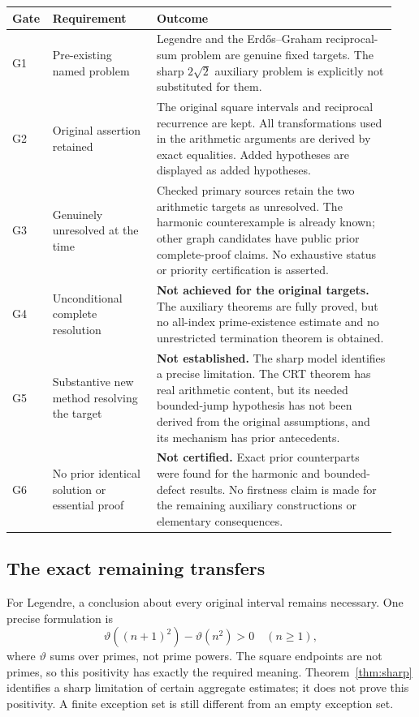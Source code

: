 \documentclass[11pt,a4paper]{article}
\theoremstyle{definition}
\theoremstyle{remark}\newtheorem{remark}[theorem]{Remark}
\begin{document}
\begin{longtable}{@{}p{0.08\linewidth}>{\raggedright\arraybackslash}p{0.26\linewidth}>{\raggedright\arraybackslash}p{0.60\linewidth}@{}}
\toprule
Gate & Requirement & Outcome\\
\midrule\endhead
G1 & Pre-existing named problem & Legendre and the Erd\H{o}s--Graham
reciprocal-sum problem are genuine fixed targets. The sharp
$2\sqrt2$ auxiliary problem is explicitly not substituted for them.\\[7pt]
G2 & Original assertion retained & The original square intervals
and reciprocal recurrence are kept. All transformations used in
the arithmetic arguments are derived by exact equalities. Added
hypotheses are displayed as added hypotheses.\\[7pt]
G3 & Genuinely unresolved at the time & Checked primary sources
retain the two arithmetic targets as unresolved. The harmonic
counterexample is already known; other graph candidates have
public prior complete-proof claims. No exhaustive status or
priority certification is asserted.\\[7pt]
G4 & Unconditional complete resolution & \textbf{Not achieved for
the original targets.} The auxiliary theorems are fully proved,
but no all-index prime-existence estimate and no unrestricted
termination theorem is obtained.\\[7pt]
G5 & Substantive new method resolving the target & \textbf{Not
established.} The sharp model identifies a precise limitation.
The CRT theorem has real arithmetic content, but its needed
bounded-jump hypothesis has not been derived from the original
assumptions, and its mechanism has prior antecedents.\\[7pt]
G6 & No prior identical solution or essential proof & \textbf{Not
certified.} Exact prior counterparts were found for the harmonic
and bounded-defect results. No firstness claim is made for the
remaining auxiliary constructions or elementary consequences.\\
\bottomrule
\end{longtable}

\subsection{The exact remaining transfers}

For Legendre, a conclusion about every original interval remains
necessary. One precise formulation is
\[
 \vartheta((n+1)^2)-\vartheta(n^2)>0\quad(n\ge1),
\]
where $\vartheta$ sums over primes, not prime powers. The square
endpoints are not primes, so this positivity has exactly the
required meaning. Theorem~\ref{thm:sharp} identifies a sharp
limitation of certain aggregate estimates; it does not prove
this positivity. A finite exception set is still different from
an empty exception set.
\end{document}
